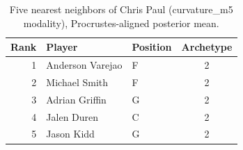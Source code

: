 \begin{table}[htbp]
  \centering\small
  \begin{tabular}{rllc}
    \toprule
    Rank & Player & Position & Archetype \\
    \midrule
    1 & Anderson Varejao & F & 2 \\
    2 & Michael Smith & F & 2 \\
    3 & Adrian Griffin & G & 2 \\
    4 & Jalen Duren & C & 2 \\
    5 & Jason Kidd & G & 2 \\
    \bottomrule
  \end{tabular}
  \caption{Five nearest neighbors of Chris Paul (curvature_m5 modality), Procrustes-aligned posterior mean.}
  \label{tab:Chris_Paul_neighbors_curvature_m5}
\end{table}

